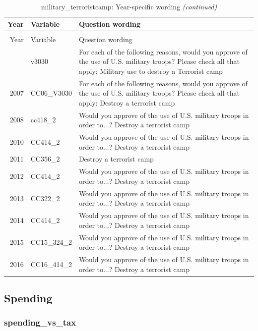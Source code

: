 \documentclass[12pt]{article}
\begin{document}
\begin{longtable}[t]{rl>{\raggedright\arraybackslash}p{10cm}}
\caption{\label{tab:unnamed-chunk-4}military\_terroristcamp: Year-specific wording}\\
\toprule
Year & Variable & Question wording\\
\midrule
\endfirsthead
\caption[]{military\_terroristcamp: Year-specific wording \textit{(continued)}}\\
\toprule
Year & Variable & Question wording\\
\midrule
\endhead
\
\endfoot
\bottomrule
\endlastfoot
2006 & v3030 & For each of the following reasons, would you approve of the use of U.S. military troops? Please check all that apply: Military use to destroy a Terrorist camp\\
2007 & CC06\_V3030 & For each of the following reasons, would you approve of the use of U.S. military troops? Please check all that apply: Destroy a terrorist camp\\
2008 & cc418\_2 & Would you approve of the use of U.S. military troops in order to...? Destroy a terrorist camp\\
2010 & CC414\_2 & Would you approve of the use of U.S. military troops in order to...? Destroy a terrorist camp\\
2011 & CC356\_2 & Destroy a terrorist camp\\
2012 & CC414\_2 & Would you approve of the use of U.S. military troops in order to...? Destroy a terrorist camp\\
2013 & CC322\_2 & Would you approve of the use of U.S. military troops in order to...? Destroy a terrorist camp\\
2014 & CC414\_2 & Would you approve of the use of U.S. military troops in order to...? Destroy a terrorist camp\\
2015 & CC15\_324\_2 & Would you approve of the use of U.S. military troops in order to...? Destroy a terrorist camp\\
2016 & CC16\_414\_2 & Would you approve of the use of U.S. military troops in order to...? Destroy a terrorist camp\\*
\end{longtable}\newpage

\subsection{Spending}\label{spending}

\subsubsection{spending\_vs\_tax}\label{spending_vs_tax}
\end{document}
